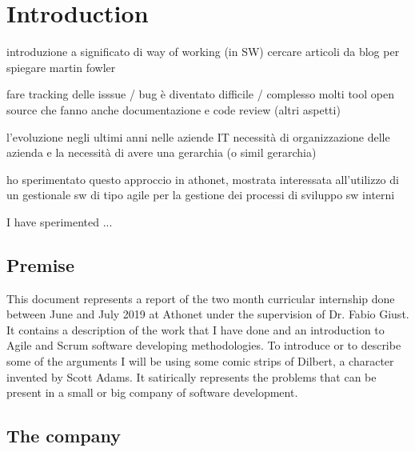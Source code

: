 \chapter{Introduction}
\label{introduction}

introduzione a significato di way of working (in SW)
	cercare articoli da blog per spiegare
	martin fowler		

fare tracking delle isssue / bug è diventato difficile / complesso
	molti tool open source che fanno anche documentazione e code review (altri aspetti)

l'evoluzione negli ultimi anni nelle aziende IT
	necessità di organizzazione delle azienda e la necessità di avere una gerarchia (o simil gerarchia)

ho sperimentato questo approccio in athonet, mostrata interessata all'utilizzo di un gestionale sw di tipo agile per la gestione dei processi di sviluppo sw interni

I have sperimented ... 

\section{Premise}

	This document represents a report of the two month curricular internship done between June and July 2019 at Athonet under the supervision of Dr. Fabio Giust.
	It contains a description of the work that I have done and an introduction to Agile and Scrum software developing methodologies.
	To introduce or to describe some of the arguments I will be using some comic strips of Dilbert, a character invented by Scott Adams.
	It satirically represents the problems that can be present in a small or big company of software development.
	
\section{The company}

